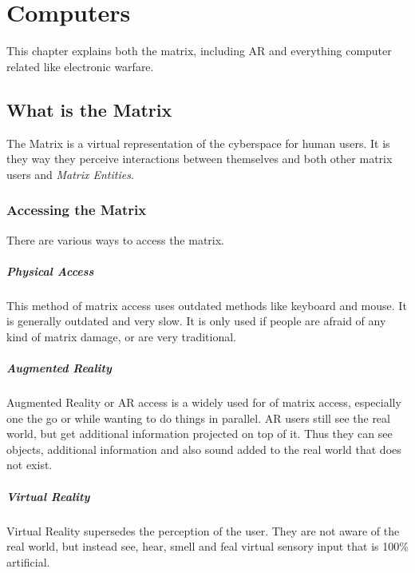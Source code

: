\chapter{Computers}
\label{chap:basics}

This chapter explains both the matrix, including AR and everything computer related
like electronic warfare.


\section{What is the Matrix}

The Matrix is a virtual representation of the cyberspace for human users. It is they way they
perceive interactions between themselves and both other matrix users and \emph{Matrix Entities}.

\subsection{Accessing the Matrix}
\label{subsec:access matrix}

There are various ways to access the matrix.

\paragraph{Physical Access}
This method of matrix access uses outdated methods like keyboard and mouse.
It is generally outdated and very slow. It is only used if people are afraid of any kind of matrix
damage, or are very traditional.

\paragraph{Augmented Reality}
Augmented Reality or AR access is a widely used for of matrix access, especially one the go
or while wanting to do things in parallel. AR users still see the real world, but get additional
information projected on top of it. Thus they can see objects, additional information and also
sound added to the real world that does not exist.

\paragraph{Virtual Reality}
Virtual Reality supersedes the perception of the user. They are not aware of the real world, but
instead see, hear, smell and feal virtual sensory input that is 100\% artificial.

